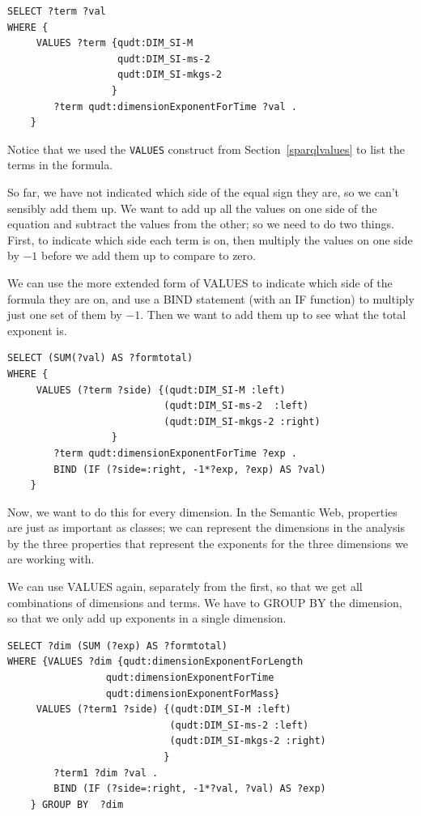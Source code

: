 \begin{lstlisting}
SELECT ?term ?val
WHERE { 
     VALUES ?term {qudt:DIM_SI-M
                   qudt:DIM_SI-ms-2 
                   qudt:DIM_SI-mkgs-2 
                  }
        ?term qudt:dimensionExponentForTime ?val .
    } 
\end{lstlisting}

Notice that we used the \texttt{VALUES} construct from Section~\ref{sparqlvalues} to 
list the terms in the formula.  

So far, we have not indicated which side of the equal sign they
are, so we can't sensibly add them up.  We want to add up all the 
values on one side of the equation and subtract the values from the other;
so we need to do two things.  First, to indicate which side each term is on,
then multiply the values on one side by $-1$ before we add them up to 
compare to zero.   

We can use the more extended form of VALUES to indicate which side of the 
formula they are on, and use a BIND statement (with an IF function) to 
multiply just one set of them by $-1$.  Then we want to add them up to 
see what the total exponent is. 

\begin{lstlisting}
SELECT (SUM(?val) AS ?formtotal)
WHERE { 
     VALUES (?term ?side) {(qudt:DIM_SI-M :left)
                           (qudt:DIM_SI-ms-2  :left)
                           (qudt:DIM_SI-mkgs-2 :right)
                  }
        ?term qudt:dimensionExponentForTime ?exp .
        BIND (IF (?side=:right, -1*?exp, ?exp) AS ?val)
    } 
\end{lstlisting}

Now, we want to do this for every dimension.  In the Semantic Web, properties
are just as important as classes; we can represent the dimensions in the 
analysis by the three properties that represent the exponents for the three 
dimensions we are working with.  

We can use VALUES again, separately from the first, so that we get all combinations 
of dimensions and terms.  We have to GROUP BY the dimension, so that we only add up
exponents in a single dimension. 

\begin{lstlisting}
SELECT ?dim (SUM (?exp) AS ?formtotal)
WHERE {VALUES ?dim {qudt:dimensionExponentForLength 
                 qudt:dimensionExponentForTime 
                 qudt:dimensionExponentForMass}
     VALUES (?term1 ?side) {(qudt:DIM_SI-M :left)
                            (qudt:DIM_SI-ms-2 :left)
                            (qudt:DIM_SI-mkgs-2 :right)
                           }
        ?term1 ?dim ?val .
        BIND (IF (?side=:right, -1*?val, ?val) AS ?exp)
    } GROUP BY  ?dim 
\end{lstlisting}

